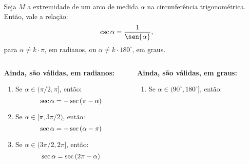 \begin{frame}
  \begin{theorem}
    Seja $M$ a extremidade de um arco de medida $\alpha$ na circunferência trigonométrica. Então, vale a relação:
    \begin{equation*}
      \csc{\alpha} = \frac{1}{\sen{\alpha}},
    \end{equation*}
    para $\alpha\not=k\cdot\pi$, em radianos, ou $\alpha\not=k\cdot 180^{\circ}$, em graus.
  \end{theorem}
  \begin{columns}[onlytextwidth]
    \begin{column}{0.49\textwidth}
      \begin{highlight}
        \textbf{Ainda, são válidas, em radianos:}
        \begin{enumerate}
          \item Se $\alpha\in(\pi/2,\pi]$, então:\vspace*{-0.2cm}
          \begin{equation*}
            \sec{\alpha}=-\sec{(\pi-\alpha)}\vspace*{-0.2cm}
          \end{equation*}
          \item Se $\alpha\in[\pi,3\pi/2)$, então:\vspace*{-0.2cm}
          \begin{equation*}
            \sec{\alpha}=-\sec{(\alpha-\pi)}\vspace*{-0.2cm}
          \end{equation*}
          \item Se $\alpha\in(3\pi/2,2\pi]$, então:\vspace*{-0.2cm}
          \begin{equation*}
            \sec{\alpha}=\sec{(2\pi-\alpha)}\vspace*{-0.2cm}
          \end{equation*}
        \end{enumerate}
      \end{highlight}
    \end{column}
    \begin{column}{0.49\textwidth}
      \begin{highlight}
        \textbf{Ainda, são válidas, em graus:}
        \begin{enumerate}
          \item Se $\alpha\in(90^{\circ},180^{\circ}]$, então:\vspace*{-0.2cm}

\end{enumerate}
\end{highlight}
\end{column}
\end{columns}
\end{frame}
